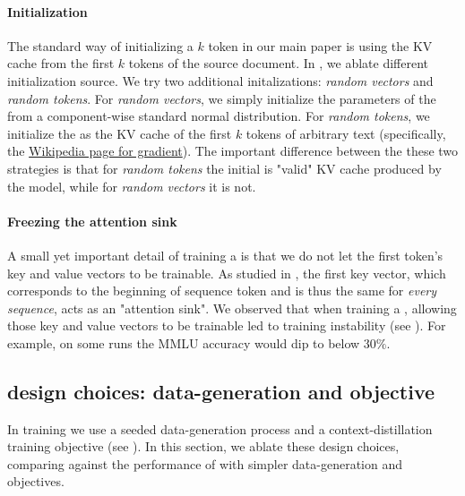 \paragraph{Initialization}

The standard way of initializing a $k$ token \artifact in our main paper is using the KV cache from the first $k$ tokens of the source document. In , we ablate different initialization source. We try two additional initalizations: \textit{random vectors} and \textit{random tokens}.
For \textit{random vectors}, we simply initialize the parameters of the \artifact from a component-wise standard normal distribution. For \textit{random tokens}, we initialize the \artifact as the KV cache of the first $k$ tokens of arbitrary text (specifically, the \href{https://en.wikipedia.org/wiki/Gradient}{Wikipedia page for gradient}). The important difference between the these two strategies is that for \textit{random tokens} the initial \artifact is "valid" KV cache produced by the model, while for \textit{random vectors} it is not.

\paragraph{Freezing the attention sink}
A small yet important detail of training a \artifact is that we do not let the first token's key and value vectors to be trainable. As studied in \cite{xiao2024efficientstreaminglanguagemodels}, the first key vector, which corresponds to the beginning of sequence token and is thus the same for \textit{every sequence}, acts as an "attention sink".  We observed that when training a \artifact, allowing those key and value vectors to be trainable led to training instability (see ). For example, on some runs the MMLU accuracy would dip to below $30\%$.
\subsection{\method design choices: data-generation and objective}
In \method training we use a seeded data-generation process and a context-distillation training objective (see ). In this section, we ablate these design choices, comparing against the performance of \method with simpler data-generation and objectives.
